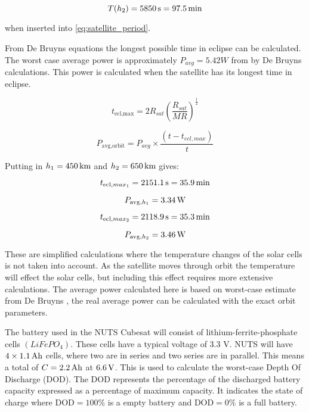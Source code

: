\begin{equation}
T(h_2) = \unit[5850]{s} = \unit[97.5]{min}
\end{equation}

when inserted into \autoref{eq:satellite_period}.

From De Bruyns equations \cite{Satellite Power Systems} the longest possible time in eclipse can be calculated. The worst case average power is approximately $P_{avg} = 5.42 W$ from by De Bruyns calculations. This power is calculated when the satellite has its longest time in eclipse.

\begin{equation}
	t_{\text{ecl,max}} = 2R_{sat}\left(\frac{R_{sat}}{MR}\right)^{\frac{1}{2}}
	\label{Maximum time in eclipse}
\end{equation}

\begin{equation}
	P_{\text{avg,orbit}} = P_{avg}\times\frac{(t-t_{ecl,max})}{t}
	\label{Average effect during one orbit}
\end{equation}

Putting in $h_1 =\unit[450]{km}$ and $h_2 = \unit[650]{km}$ gives:

\begin{equation}
t_{\text{ecl},max_1} = \unit[2151.1]{s} = \unit[35.9]{min}
\end{equation}

\begin{equation}
P_{\text{avg},h_1} = \unit[3.34]{W}
\end{equation}

\begin{equation}
t_{\text{ecl},max_2} = \unit[2118.9]{s} = \unit[35.3]{min}
\end{equation}

\begin{equation}
P_{\text{avg},h_2} = \unit[3.46]{W}
\end{equation}

These are simplified calculations where the temperature changes of the solar cells is not taken into account. As the satellite moves through orbit the temperature will effect the solar cells, but including this effect requires more extensive calculations. The average power calculated here is based on worst-case estimate from De Bruyns \cite{Satellite Power Systems}, the real average power can be calculated with the exact orbit parameters. 

The battery used in the NUTS Cubesat will consist of lithium-ferrite-phosphate cells $(LiFePO_4)$\cite{Overview of NUTS}. 
These cells have a typical voltage of 3.3 V. NUTS will have $4\times \unit[1.1]{Ah}$ cells, where two are in series and two series are in parallel. This means a total of $C=\unit[2.2]{Ah}$ at $\unit[6.6]{V}$\cite{Satellite Power Systems}. This is used to calculate the worst-case Depth Of Discharge (DOD). The DOD represents the percentage of the discharged battery capacity expressed as a percentage of maximum capacity. It indicates the state of charge where $\text{DOD} = 100\% $ is a empty battery and $\text{DOD}=0\%$ is a full battery.

